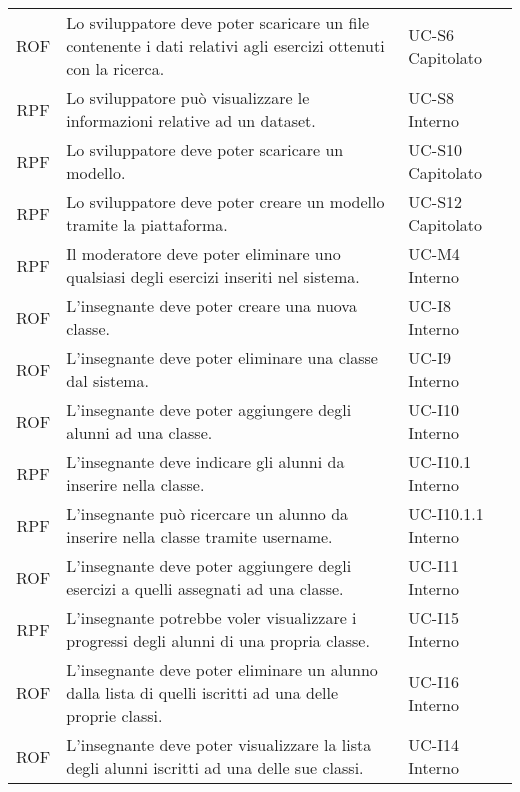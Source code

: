 \begin{tabularx}{\textwidth}{| c | p{10cm} | X |}
		ROF & Lo sviluppatore deve poter scaricare un file contenente i dati relativi agli esercizi ottenuti con la ricerca. & UC-S6 \newline Capitolato\\
		RPF & Lo sviluppatore può visualizzare le informazioni relative ad un dataset. & UC-S8 \newline Interno\\
		RPF & Lo sviluppatore deve poter scaricare un modello. & UC-S10 \newline Capitolato\\
		RPF & Lo sviluppatore deve poter creare un modello tramite la piattaforma. & UC-S12 \newline Capitolato\\ 
		RPF & Il moderatore deve poter eliminare uno qualsiasi degli esercizi inseriti nel sistema. & UC-M4 \newline Interno\\
		ROF & L'insegnante deve poter creare una nuova classe. & UC-I8 \newline Interno\\
		ROF & L'insegnante deve poter eliminare una classe dal sistema. & UC-I9 \newline Interno\\
		ROF & L'insegnante deve poter aggiungere degli alunni ad una classe. & UC-I10 \newline Interno\\
		RPF & L'insegnante deve indicare gli alunni da inserire nella classe. & UC-I10.1 \newline Interno\\
		RPF & L'insegnante può ricercare un alunno da inserire nella classe tramite username. & UC-I10.1.1 \newline Interno\\
		ROF & L'insegnante deve poter aggiungere degli esercizi a quelli assegnati ad una classe. & UC-I11 \newline Interno\\
		RPF & L'insegnante potrebbe voler visualizzare i progressi degli alunni di una propria classe. & UC-I15 \newline Interno\\
		ROF & L'insegnante deve poter eliminare un alunno dalla lista di quelli iscritti ad una delle proprie classi. & UC-I16 \newline Interno\\
		ROF & L'insegnante deve poter visualizzare la lista degli alunni iscritti ad una delle sue classi. & UC-I14 \newline Interno\\

\end{tabularx}
